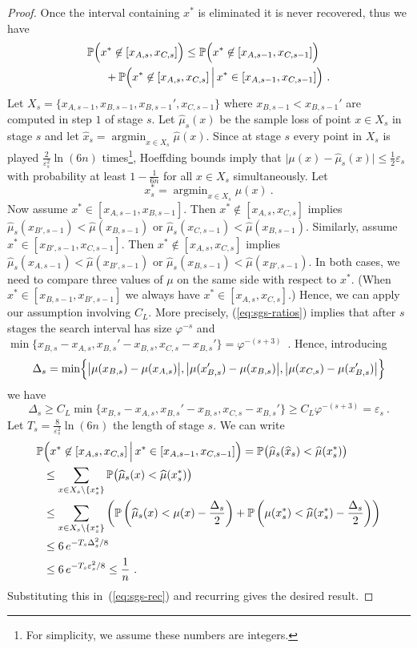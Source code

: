 \documentclass[11pt]{hackednow}
\renewcommand{\P}{\mathbb{P}}
\newcommand{\wh}{\widehat}
\newcommand{\argmin}{\mathop{\mathrm{argmin}}}
\newcommand{\ve}{\varepsilon}
\newcommand{\xhat}{\wh{x}}
\newcommand{\muhat}{\wh{\mu}}
\begin{document}
\begin{proof}
Once the interval containing $x^*$ is eliminated it is never recovered, thus we have
\begin{align}
\nonumber
    \P&\Bigl(x^* \not\in [x_{A,s},x_{C,s}]\Bigr)
\le
    \P\Bigl(x^* \not\in [x_{A,s-1},x_{C,s-1}]\Bigr)
\\ &\quad
\label{eq:sgs-rec}
    + \P\Bigl(x^* \not\in [x_{A,s},x_{C,s}] \,\Big|\, x^* \in [x_{A,s-1},x_{C,s-1}]\Bigr)~.
\end{align}
Let $X_s = \{x_{A,s-1},x_{B,s-1},x_{B,s-1}',x_{C,s-1}\}$ where $x_{B,s-1} < x_{B,s-1}'$ are computed in step $1$ of stage $s$.
Let $\muhat_s(x)$ be the sample loss of point $x\in X_s$ in stage $s$ and let $\xhat_s = \argmin_{x\in X_s}\muhat(x)$. Since at stage $s$ every point in $X_s$ is played $\tfrac{2}{\ve_s^2}\ln(6n)$ times\footnote{For simplicity, we assume these numbers are integers.}, Hoeffding bounds imply that $\bigl|\mu(x)-\muhat_s(x)\bigr| \le \tfrac{1}{2}\ve_s$ with probability at least $1-\tfrac{1}{6n}$ for all $x\in X_s$ simultaneously. Let
\[
    x^*_s = \argmin_{x\in X_s}\mu(x)~.
\]
Now assume $x^* \in [x_{A,s-1},x_{B,s-1}]$. Then $x^* \not\in [x_{A,s},x_{C,s}]$ implies $\muhat_s(x_{B',s-1}) < \muhat(x_{B,s-1})$ or $\muhat_s(x_{C,s-1}) < \muhat(x_{B,s-1})$. Similarly, assume $x^* \in [x_{B',s-1},x_{C,s-1}]$. Then $x^* \not\in [x_{A,s},x_{C,s}]$ implies $\muhat_s(x_{A,s-1}) < \muhat(x_{B',s-1})$ or $\muhat_s(x_{B,s-1}) < \muhat(x_{B',s-1})$. In both cases, we need to compare three values of $\mu$ on the same side with respect to $x^*$. (When $x^* \in [x_{B,s-1},x_{B',s-1}]$ we always have $x^* \in [x_{A,s},x_{C,s}]$.) Hence, we can apply our assumption involving $C_L$. More precisely, (\ref{eq:sgs-ratios}) implies that after $s$ stages the search interval has size $\varphi^{-s}$ and $\min\{x_{B,s}-x_{A,s}, x_{B,s}'-x_{B,s}, x_{C,s} - x_{B,s}'\} = \varphi^{-(s+3)}$~. Hence, introducing
\[
    \Delta_s = \min\Bigl\{\big|\mu(x_{B,s})-\mu(x_{A,s})\big|, \big|\mu(x_{B,s}')-\mu(x_{B,s})\big|, \big|\mu(x_{C,s}) - \mu(x_{B,s}')\big|\Bigr\}
\]
we have
\[
    \Delta_s
\ge
    C_L\min\{x_{B,s}-x_{A,s}, x_{B,s}'-x_{B,s}, x_{C,s} - x_{B,s}'\} \ge C_L\varphi^{-(s+3)} = \ve_s~.
\]
Let $T_s = \tfrac{8}{\ve_s^2}\ln(6n)$ the length of stage $s$. We can write
\begin{align*}
    \P&\Bigl(x^* \not\in [x_{A,s},x_{C,s}] \,\Big|\, x^* \in [x_{A,s-1},x_{C,s-1}]\Bigr)
=
    \P\bigl(\muhat_s(\xhat_s) < \muhat(x^*_s)\bigr)
\\ &\le
    \sum_{x \in X_s\setminus\{x^*_s\}}\P\bigl(\muhat_s(x) < \muhat(x^*_s)\bigr)
\\ &\le
    \sum_{x \in X_s\setminus\{x^*_s\}}\left( \P\left(\muhat_s(x) < \mu(x) - \frac{\Delta_s}{2}\right) + \P\left(\mu(x^*_s) < \muhat(x^*_s) - \frac{\Delta_s}{2}\right)\right)
\\ &\le
    6\,e^{-T_s\Delta_s^2/8} 
\\ &\le
    6\,e^{-T_s\ve_s^2/8} 
\le
    \frac{1}{n}~.
\end{align*}
Substituting this in~(\ref{eq:sgs-rec}) and recurring gives the desired result.
\end{proof}
\end{document}
